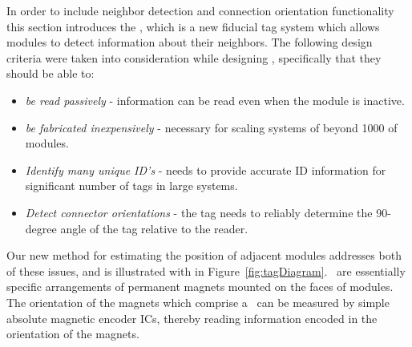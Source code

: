 In order to include neighbor detection and connection orientation functionality this section introduces the \TagNamePlural, which is a new fiducial tag system which allows modules to detect information about their neighbors. The following design criteria were taken into consideration while designing \TagNamePlural, specifically that they should be able to:
\begin{itemize}
	\item \emph{be read passively} - information can be read even when the module is inactive.
	\item \emph{be fabricated inexpensively} - necessary for scaling systems of beyond 1000 of modules.
	\item \emph{Identify many unique ID's} - needs to provide accurate ID information for significant number of tags in large systems.
	\item \emph{Detect connector orientations} - the tag needs to reliably determine the 90-degree angle of the tag relative to the reader.
\end{itemize} 

Our new method for estimating the position of adjacent modules addresses both of these issues, and is illustrated with in Figure~\ref{fig:tagDiagram}. \TagNamePlural~are essentially specific arrangements of permanent magnets mounted on the faces of modules.  The orientation of the magnets which comprise a \tagName~can be measured by simple absolute magnetic encoder ICs, thereby reading information encoded in the orientation of the magnets.


